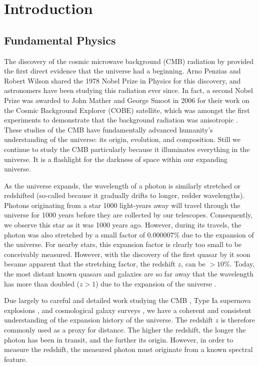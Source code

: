 \chapter{Introduction}

\begin{bibunit}

\section{Fundamental Physics}

The discovery of the cosmic microwave background (CMB) radiation by \citet{1965ApJ...142..419P}
provided the first direct evidence that the universe had a beginning. Arno Penzias and Robert Wilson
shared the 1978 Nobel Prize in Physics for this discovery, and astronomers have been studying this
radiation ever since. In fact, a second Nobel Prize was awarded to John Mather and George Smoot in
2006 for their work on the Cosmic Background Explorer (COBE) satellite, which was amongst the first
experiments to demonstrate that the background radiation was anisotropic
\citep{1992ApJ...396L...1S}. These studies of the CMB have fundamentally advanced humanity's
understanding of the universe: its origin, evolution, and composition. Still we continue to study
the CMB particularly because it illuminates everything in the universe. It is a flashlight for the
darkness of space within our expanding universe.

As the universe expands, the wavelength of a photon is similarly stretched or redshifted (so-called
because it gradually drifts to longer, redder wavelengths). Photons originating from a star 1000
light-years away will travel through the universe for 1000 years before they are collected by our
telescopes. Consequently, we observe this star as it was 1000 years ago. However, during its travels,
the photon was also stretched by a small factor of $0.000007\%$ due to the expansion of the
universe.  For nearby stars, this expansion factor is clearly too small to be conceivably measured.
However, with the discovery of the first quasar by \citet{1963Natur.197.1040S} it soon became
apparent that the stretching factor, the redshift $z$, can be $>10\%$. Today, the most distant known
quasars and galaxies are so far away that the wavelength has more than doubled ($z > 1$) due to the
expansion of the universe \citep{2011Natur.474..616M, 2015ApJ...810L..12Z, 2016ApJ...819..129O,
2018Natur.553..473B}.

Due largely to careful and detailed work studying the CMB \citep[e.g.,][]{2016A&A...594A..25P}, Type
Ia supernova explosions \citep[e.g.,][]{1998AJ....116.1009R,1999ApJ...517..565P}, and cosmological
galaxy surveys \citep[e.g.,][]{2001MNRAS.328.1039C}, we have a coherent and consistent understanding
of the expansion history of the universe. The redshift $z$ is therefore commonly used as a proxy
for distance. The higher the redshift, the longer the photon has been in transit, and the further
its origin. However, in order to measure the redshift, the measured photon must originate from a
known spectral feature.


\end{bibunit}
